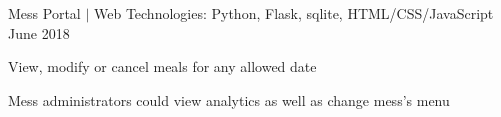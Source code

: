 \begin{cventries}
    \cventry
    {Mess Portal $|$ Web} %
    {Technologies: Python, Flask, sqlite, HTML/CSS/JavaScript} %
    {June 2018} %
    {} %
    {
      \begin{cvitems} %
        \item {View, modify or cancel meals for any allowed date}
        \item {Mess administrators could view analytics as well as change mess's menu}
      \end{cvitems}
    }
    
\end{cventries}







